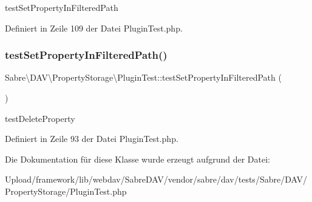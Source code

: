 test\+Set\+Property\+In\+Filtered\+Path 

Definiert in Zeile 109 der Datei Plugin\+Test.\+php.

\mbox{\label{class_sabre_1_1_d_a_v_1_1_property_storage_1_1_plugin_test_adc266f7fef8515efcd9332e4c4c39cb9}} 
\subsubsection{\texorpdfstring{test\+Set\+Property\+In\+Filtered\+Path()}{testSetPropertyInFilteredPath()}}
{\footnotesize\ttfamily Sabre\textbackslash{}\+D\+A\+V\textbackslash{}\+Property\+Storage\textbackslash{}\+Plugin\+Test\+::test\+Set\+Property\+In\+Filtered\+Path (\begin{DoxyParamCaption}{ }\end{DoxyParamCaption})}

test\+Delete\+Property 

Definiert in Zeile 93 der Datei Plugin\+Test.\+php.



Die Dokumentation für diese Klasse wurde erzeugt aufgrund der Datei\+:\begin{DoxyCompactItemize}
\item 
Upload/framework/lib/webdav/\+Sabre\+D\+A\+V/vendor/sabre/dav/tests/\+Sabre/\+D\+A\+V/\+Property\+Storage/Plugin\+Test.\+php\end{DoxyCompactItemize}
